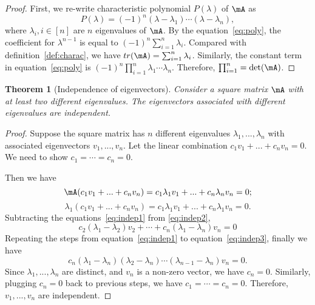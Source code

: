 \documentclass[11pt]{article}
\theoremstyle{plain}
\newtheorem{thm}{Theorem}[section]
\theoremstyle{definition}
\begin{document}
\begin{proof}
	First, we re-write characteristic polynomial $P(\lambda)$ of $\mA$ as
	\begin{equation}\label{eq:poly}
		P(\lambda) = (-1)^n (\lambda - \lambda_1)\cdots (\lambda - \lambda_n), 
	\end{equation}   
	where $\lambda_i, i \in [n]$ are $n$ eigenvalues of $\mA$. By the equation~\eqref{eq:poly}, the coefficient for $\lambda^{n-1}$ is equal to $(-1)^n\sum_{i=1}^n \lambda_i$. Compared with definition~\ref{def:charac}, we have $tr(\mA) = \sum_{i=1}^n \lambda_i$. Similarly, the constant term in equation~\eqref{eq:poly} is $(-1)^n \prod_{i=1}^n \lambda_1 \cdots \lambda_n $. Therefore, $\prod_{i=1}^n = \det(\mA)$.
\end{proof}


\begin{thm}[Independence of eigenvectors]\label{thm:indepeigen} 
Consider a square matrix $\mA$ with at least two different eigenvalues. The eigenvectors associated with different eigenvalues are independent.
\end{thm}

\begin{proof}
	Suppose the square matrix has $n$ different eigenvalues $\lambda_1,...,\lambda_n$ with associated eigenvectors  $v_1,...,v_n$. Let the linear combination $c_1 v_1 + ... + c_n v_n = 0$. We need to show $c_1 =\cdots = c_n = 0$.
	
	Then we have
	\begin{equation}\label{eq:indep1}
		\mA(c_1 v_1 + ... + c_n v_n ) = c_1 \lambda_1 v_1 + ... + c_n \lambda_n v_n = 0;  
		\end{equation}
		\begin{equation}\label{eq:indep2}
		\lambda_1 (c_1 v_1 + ... + c_n v_n ) = c_1 \lambda_1 v_1 + ... + c_n \lambda_1 v_n = 0. 
	\end{equation}
	Subtracting the equations~\eqref{eq:indep1} from \eqref{eq:indep2}, 
	\begin{equation}\label{eq:indep3}
		 c_2 (\lambda_1 - \lambda_2) v_2 + \cdots + c_n (\lambda_1 - \lambda_n) v_n  = 0
	\end{equation}
	Repeating the steps from equation~\eqref{eq:indep1} to equation~\eqref{eq:indep3}, finally we have 
	\[ c_n(\lambda_1 - \lambda_n)(\lambda_2 - \lambda_n)\cdots (\lambda_{n-1} - \lambda_n) v_n = 0.    \]
	 Since $\lambda_1 ,..., \lambda_n$ are distinct, and $v_n$ is a non-zero vector, we have $c_n = 0$. Similarly, plugging $c_n = 0$ back to previous steps, we have $c_1 = \cdots = c_n = 0$. Therefore, $v_1,...,v_n$ are independent.
\end{proof}
\end{document}
